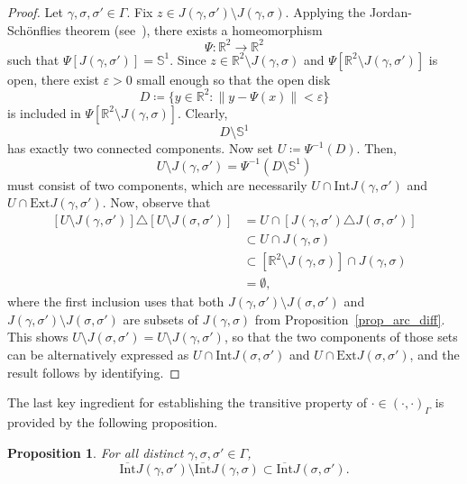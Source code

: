 \documentclass[a4paper, 11pt]{article} %
\theoremstyle{plain}
\newtheorem{proposition}[theorem]{Proposition}
\newcommand{\Int}{\mathrm{Int}}
\newcommand{\clInt}{\overline{\mathrm{Int}}}
\newcommand{\Ext}{\mathrm{Ext}}
\newcommand{\R}{\mathbb{R}}
\newcommand{\1}{\mathds 1}
\numberwithin{equation}{section}
\begin{document}
\begin{proof}
    Let $\gamma,\sigma,\sigma'\in\Gamma$. Fix $z\in J(\gamma,\sigma')\setminus J(\gamma,\sigma)$. Applying the Jordan-Schönflies theorem (see~\cite{topology_book}), there exists a homeomorphism
        \[\Psi:\R^2\to\R^2\]
    such that $\Psi[J(\gamma,\sigma')]=\mathbb S^1$. Since $z\in\R^2\setminus J(\gamma,\sigma)$ and $\Psi[\R^2\setminus J(\gamma,\sigma')]$ is open, there exist $\varepsilon>0$ small enough so that the open disk
        \[D\coloneqq\{y\in\R^2:\|y-\Psi(x)\|<\varepsilon\}\]
    is included in $\Psi[\R^2\setminus J(\gamma,\sigma)]$. Clearly,
        \[D\setminus\mathbb S^1\]
    has exactly two connected components. Now set $U\coloneqq\Psi^{-1}(D)$. Then,
        \[U\setminus J(\gamma,\sigma')=\Psi^{-1}(D\setminus\mathbb S^1)\]
    must consist of two components, which are necessarily $U\cap\Int J(\gamma,\sigma')$ and $U\cap\Ext J(\gamma,\sigma')$. Now, observe that
        \begin{equation*}
            \begin{split}
                [U\setminus J(\gamma,\sigma')]\triangle[U\setminus J(\sigma,\sigma')]&=U\cap[J(\gamma,\sigma')\triangle J(\sigma,\sigma')]\\
                &\subset U\cap J(\gamma,\sigma)\\
                &\subset[\R^2\setminus J(\gamma,\sigma)]\cap J(\gamma,\sigma)\\
                &=\emptyset,
            \end{split}
        \end{equation*}
    where the first inclusion uses that both $J(\gamma,\sigma')\setminus J(\sigma,\sigma')$ and $J(\gamma,\sigma')\setminus J(\sigma,\sigma')$ are subsets of $J(\gamma,\sigma)$ from Proposition~\ref{prop_arc_diff}. This shows $U\setminus J(\sigma,\sigma')=U\setminus J(\gamma,\sigma')$, so that the two components of those sets can be alternatively expressed as $U\cap\Int J(\sigma,\sigma')$ and $U\cap\Ext J(\sigma,\sigma')$, and the result follows by identifying.
\end{proof}


The last key ingredient for establishing the transitive property of $\cdot\in(\cdot,\cdot)_\Gamma$ is provided by the following proposition.


\begin{proposition}
    \label{prop_interior_diff}
    For all distinct $\gamma,\sigma,\sigma'\in\Gamma$,
        \[\clInt J(\gamma,\sigma')\setminus\clInt J(\gamma,\sigma)\subset\clInt J(\sigma,\sigma').\]
\end{proposition}
\end{document}
